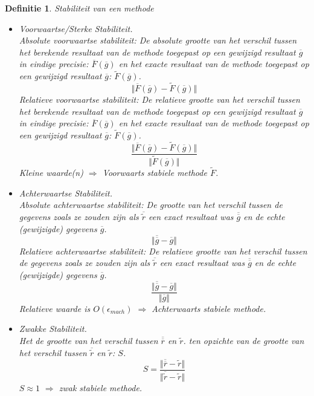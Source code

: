 \documentclass[12pt,a4paper]{article}
\newtheorem{defi}{Definitie}
\begin{document}
\begin{defi}
Stabiliteit van een methode\\
\begin{itemize}
\item Voorwaartse/Sterke Stabiliteit.\\
Absolute voorwaartse stabiliteit:
De absolute grootte van het verschil tussen het berekende resultaat van de methode toegepast op een gewijzigd resultaat $\overline{g}$ in eindige precisie: $\overline{F}(\overline{g})$ en het exacte resultaat van de methode toegepast op een gewijzigd resultaat $\overline{g}$: $\widetilde{F}(\overline{g})$.
\[
\Vert \overline{F}(\overline{g}) - \widetilde{F}(\overline{g}) \Vert
\]
Relatieve voorwaartse stabiliteit:
De relatieve grootte van het verschil tussen het berekende resultaat van de methode toegepast op een gewijzigd resultaat $\overline{g}$ in eindige precisie: $\overline{F}(\overline{g})$ en het exacte resultaat van de methode toegepast op een gewijzigd resultaat $\overline{g}$: $\widetilde{F}(\overline{g})$.
\[
\frac{\Vert \overline{F}(\overline{g}) - \widetilde{F}(\overline{g}) \Vert}{\Vert \widetilde{F}(\overline{g}) \Vert}
\]
Kleine waarde(n) $\Rightarrow$ Voorwaarts stabiele methode $\widetilde{F}$.

\item Achterwaartse Stabiliteit.\\
Absolute achterwaartse stabiliteit: De grootte van het verschil tussen de gegevens zoals ze zouden zijn als $\overline{\widetilde{r}}$ een exact resultaat was $\overline{\overline{g}}$ en de echte (gewijzigde) gegevens $\overline{g}$. 
\[
\Vert \overline{\overline{g}} - \overline{g} \Vert
\]
Relatieve achterwaartse stabiliteit: De relatieve grootte van het verschil tussen de gegevens zoals ze zouden zijn als $\overline{\widetilde{r}}$ een exact resultaat was $\overline{\overline{g}}$ en de echte (gewijzigde) gegevens $\overline{g}$. 
\[
\frac{\Vert \overline{\overline{g}} - \overline{g} \Vert}{\Vert \overline{g} \Vert}
\]
Relatieve waarde is $O(\epsilon_{mach})$ $\Rightarrow$ Achterwaarts stabiele methode.

\item Zwakke Stabiliteit.\\
Het de grootte van het verschil tussen $\overline{\overline{r}}$ en $\widetilde{r}$. ten opzichte van de grootte van het verschil tussen $\overline{\widetilde{r}}$ en $\widetilde{r}$: $S$.
\[
S =
\frac
{\Vert \overline{\overline{r}} - \widetilde{r} \Vert}
{\Vert \overline{\widetilde{r}} - \widetilde{r}\Vert}
\]
$S \approx 1$ $\Rightarrow$ zwak stabiele methode.
\end{itemize}
\end{defi}
\end{document}

